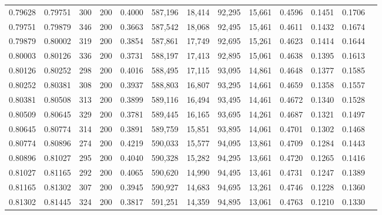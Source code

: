 \begin{tabular}{rrrrrrrrrrrrr}
0.79628 & 0.79751 &   300 & 200 &                                     0.4000 & 587,196 &  18,414 &  92,295 &  15,661 & 0.4596 & 0.1451 & 0.1706 \\
0.79751 & 0.79879 &   346 & 200 &                                     0.3663 & 587,542 &  18,068 &  92,495 &  15,461 & 0.4611 & 0.1432 & 0.1674 \\
0.79879 & 0.80002 &   319 & 200 &                                     0.3854 & 587,861 &  17,749 &  92,695 &  15,261 & 0.4623 & 0.1414 & 0.1644 \\
0.80003 & 0.80126 &   336 & 200 &                                     0.3731 & 588,197 &  17,413 &  92,895 &  15,061 & 0.4638 & 0.1395 & 0.1613 \\
0.80126 & 0.80252 &   298 & 200 &                                     0.4016 & 588,495 &  17,115 &  93,095 &  14,861 & 0.4648 & 0.1377 & 0.1585 \\
0.80252 & 0.80381 &   308 & 200 &                                     0.3937 & 588,803 &  16,807 &  93,295 &  14,661 & 0.4659 & 0.1358 & 0.1557 \\
0.80381 & 0.80508 &   313 & 200 &                                     0.3899 & 589,116 &  16,494 &  93,495 &  14,461 & 0.4672 & 0.1340 & 0.1528 \\
0.80509 & 0.80645 &   329 & 200 &                                     0.3781 & 589,445 &  16,165 &  93,695 &  14,261 & 0.4687 & 0.1321 & 0.1497 \\
0.80645 & 0.80774 &   314 & 200 &                                     0.3891 & 589,759 &  15,851 &  93,895 &  14,061 & 0.4701 & 0.1302 & 0.1468 \\
0.80774 & 0.80896 &   274 & 200 &                                     0.4219 & 590,033 &  15,577 &  94,095 &  13,861 & 0.4709 & 0.1284 & 0.1443 \\
0.80896 & 0.81027 &   295 & 200 &                                     0.4040 & 590,328 &  15,282 &  94,295 &  13,661 & 0.4720 & 0.1265 & 0.1416 \\
0.81027 & 0.81165 &   292 & 200 &                                     0.4065 & 590,620 &  14,990 &  94,495 &  13,461 & 0.4731 & 0.1247 & 0.1389 \\
0.81165 & 0.81302 &   307 & 200 &                                     0.3945 & 590,927 &  14,683 &  94,695 &  13,261 & 0.4746 & 0.1228 & 0.1360 \\
0.81302 & 0.81445 &   324 & 200 &                                     0.3817 & 591,251 &  14,359 &  94,895 &  13,061 & 0.4763 & 0.1210 & 0.1330 \\

\end{tabular}
